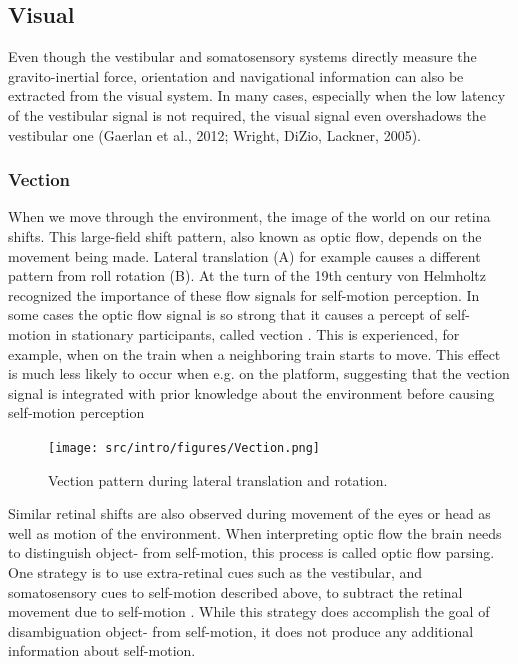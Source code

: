 \subsection{Visual}
Even though the vestibular and somatosensory systems directly measure the gravito-inertial force, orientation and navigational information can also be extracted from the visual system. In many cases, especially when the low latency of the vestibular signal is not required, the visual signal even overshadows the vestibular one \cite{wright2005,gaerlan2012} (Gaerlan et al., 2012; Wright, DiZio, Lackner, 2005).

\subsubsection{Vection}
When we move through the environment, the image of the world on our retina shifts. This large-field shift pattern, also known as optic flow, depends on the movement being made. Lateral translation (A) for example causes a different pattern from roll rotation (B). At the turn of the 19th century von Helmholtz \citeyear{vonhelmholtz1867} recognized the importance of these flow signals for self-motion perception. In some cases the optic flow signal is so strong that it causes a percept of self-motion in stationary participants, called vection \cite{dichgans1978}. This is experienced, for example, when on the train when a neighboring train starts to move. This effect is much less likely to occur when e.g. on the platform, suggesting that the vection signal is integrated with prior knowledge about the environment before causing self-motion perception \cite{andersen1985,lepecq1995}


\begin{figure}
    \texttt{[image: src/intro/figures/Vection.png]}

    \caption{Vection pattern during  lateral translation and  rotation.}
    \label{intro:fig2}
\end{figure}

Similar retinal shifts are also observed during movement of the eyes or head as well as motion of the environment. When interpreting optic flow the brain needs to distinguish object- from self-motion, this process is called optic flow parsing. One strategy is to use extra-retinal cues such as the vestibular, and somatosensory cues to self-motion described above, to subtract the retinal movement due to self-motion \cite{wertheim1994,wexler2001,macneilage2012}. While this strategy does accomplish the goal of disambiguation object- from self-motion, it does not produce any additional information about self-motion.

